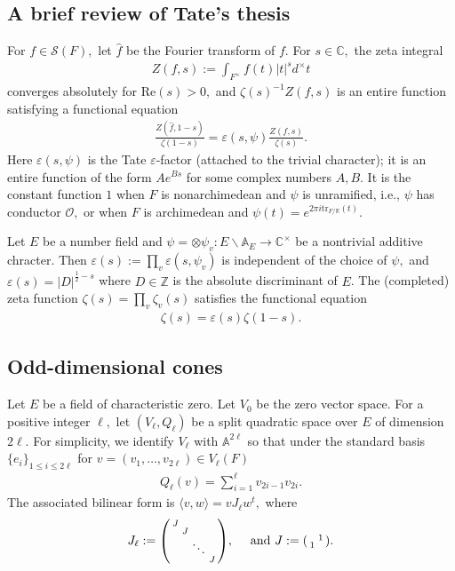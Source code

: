 \documentclass[11pt,a4paper,reqno]{amsart}
\theoremstyle{remark}
\numberwithin{equation}{section}
\newcommand{\A}{\mathbb{A}}
\newcommand{\ZZ}{\mathbb{Z}}
\newcommand{\OO}{\mathcal{O}}
\newcommand{\CC}{\mathbb{C}}
\newcommand{\RR}{\mathbb{R}}
\theoremstyle{definition}
\numberwithin{equation}{section}
\renewcommand{\hat}{\widehat}
\newenvironment{psmatrix}
  {\left(\begin{smallmatrix}}
  {\end{smallmatrix}\right)}
\begin{document}
\subsection{A brief review of Tate's thesis}\label{ssec:Tate}

For $f\in \mathcal{S}(F),$ let $\hat{f}$ be the Fourier transform of $f$. For $s\in \CC,$ the zeta integral
\begin{align*}
    Z(f,s):=\int_{F^\times} f(t)|t|^s d^\times t
\end{align*}
converges absolutely for $\mathrm{Re}(s)>0,$ and $\zeta(s)^{-1}Z(f,s)$ is an entire function satisfying a functional equation
\begin{align}\label{eq:Tate}
    \frac{Z(\hat{f},1-s)}{\zeta(1-s)}=\varepsilon(s,\psi)\frac{Z(f,s)}{\zeta(s)}.
\end{align}
Here $\varepsilon(s,\psi)$ is the Tate $\varepsilon$-factor (attached to the trivial character); it is an entire function of the form $Ae^{Bs}$ for some complex numbers $A,B$. It is the constant function $1$ when $F$ is nonarchimedean and $\psi$ is unramified, i.e., $\psi$ has conductor $\OO,$ or when $F$ is archimedean and $\psi(t)=e^{2\pi i\mathrm{tr}_{F/\RR}(t)}.$

Let $E$ be a number field and $\psi=\otimes \psi_v:E\backslash \A_E\to \CC^\times$ be a nontrivial additive chracter. Then $\varepsilon(s):=\prod_{v} \varepsilon(s,\psi_v)$ is independent of the choice of $\psi,$ and $\varepsilon(s)=|D|^{\frac{1}{2}-s}$ where $D\in \ZZ$ is the absolute discriminant of $E$. The (completed) zeta function $\zeta(s)=\prod_{v}\zeta_v(s)$ satisfies the functional equation
\begin{align*}
    \zeta(s)=\varepsilon(s)\zeta(1-s).
\end{align*}


\subsection{Odd-dimensional cones}

Let $E$ be a field of characteristic zero. Let $V_0$ be the zero vector space. For a positive integer $\ell,$ let $(V_\ell,Q_\ell)$ be a split quadratic space over $E$ of dimension $2\ell$. For simplicity, we identify $V_\ell$ with $\A^{2\ell}$ so that under the standard basis $\{e_i\}_{1\le i\le 2\ell}$ for $v=(v_1,\ldots, v_{2\ell})\in V_\ell(F)$
\begin{align*}
    Q_\ell(v)=\sum_{i=1}^{\ell} v_{2i-1}v_{2i}.
\end{align*}
The associated bilinear form is $ \langle v,w\rangle=vJ_\ell w^t,$ where
\begin{align*}
        J_\ell:=\begin{psmatrix}
             J & & &\\
               & J & &\\
               & & \ddots & \\
               & & & J
        \end{psmatrix},\quad \textrm{  and } J:=\begin{psmatrix}
         & 1\\
         1 &   
        \end{psmatrix}.
\end{align*}
\end{document}
